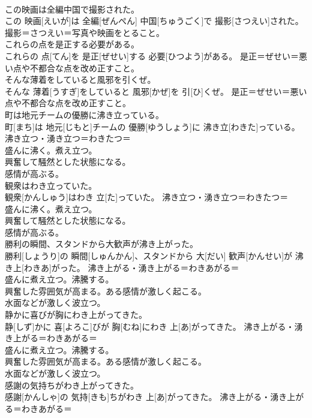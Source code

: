 \documentclass[8pt]{extreport}
\begin{document}
\begin{CJK}{UTF8}{min}
{\\	この映画は全編中国で撮影された。	
\\	この 映画[えいが]は 全編[ぜんぺん] 中国[ちゅうごく]で 撮影[さつえい]された。	撮影＝さつえい＝写真や映画をとること。
\\	これらの点を是正する必要がある。	
\\	これらの 点[てん]を 是正[ぜせい]する 必要[ひつよう]がある。	是正＝ぜせい＝悪い点や不都合な点を改め正すこと。
\\	そんな薄着をしていると風邪を引くぜ。	
\\	そんな 薄着[うすぎ]をしていると 風邪[かぜ]を 引[ひ]くぜ。	是正＝ぜせい＝悪い点や不都合な点を改め正すこと。
\\	町は地元チームの優勝に沸き立っている。	
\\	町[まち]は 地元[じもと]チームの 優勝[ゆうしょう]に 沸き立[わきた]っている。	沸き立つ・湧き立つ＝わきたつ＝ 
\\	盛んに沸く。煮え立つ。 
\\	興奮して騒然とした状態になる。 
\\	感情が高ぶる。
\\	観衆はわき立っていた。	
\\	観衆[かんしゅう]はわき 立[た]っていた。	沸き立つ・湧き立つ＝わきたつ＝ 
\\	盛んに沸く。煮え立つ。 
\\	興奮して騒然とした状態になる。 
\\	感情が高ぶる。
\\	勝利の瞬間、スタンドから大歓声が沸き上がった。	
\\	勝利[しょうり]の 瞬間[しゅんかん]、スタンドから 大[だい] 歓声[かんせい]が 沸き上[わきあ]がった。	沸き上がる・湧き上がる＝わきあがる＝ 
\\	盛んに煮え立つ。沸騰する。 
\\	興奮した雰囲気が高まる。ある感情が激しく起こる。 
\\	水面などが激しく波立つ。
\\	静かに喜びが胸にわき上がってきた。	
\\	静[しず]かに 喜[よろこ]びが 胸[むね]にわき 上[あ]がってきた。	沸き上がる・湧き上がる＝わきあがる＝ 
\\	盛んに煮え立つ。沸騰する。 
\\	興奮した雰囲気が高まる。ある感情が激しく起こる。 
\\	水面などが激しく波立つ。
\\	感謝の気持ちがわき上がってきた。	
\\	感謝[かんしゃ]の 気持[きも]ちがわき 上[あ]がってきた。	沸き上がる・湧き上がる＝わきあがる＝ 
}
\end{CJK}
\end{document}
